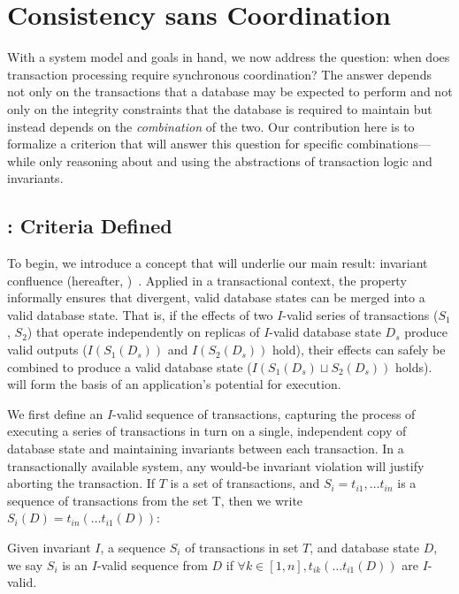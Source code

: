 
\section{Consistency sans Coordination}
\label{sec:bcc-theory}

With a system model and goals in hand, we now address the question:
when does transaction processing require synchronous coordination? The
answer depends not only on the transactions that a database may be
expected to perform and not only on the integrity constraints that the
database is required to maintain but instead depends on the
\textit{combination} of the two. Our contribution here is to formalize
a criterion that will answer this question for specific
combinations---while only reasoning about and using the abstractions
of transaction logic and invariants.

\subsection{\iconfluence: Criteria Defined}

To begin, we introduce a concept that will underlie our main result:
invariant confluence (hereafter,
\iconfluence)~\cite{obs-confluence}. Applied in a transactional
context, the \iconfluence property informally ensures that divergent,
valid database states can be merged into a valid database state. That
is, if the effects of two $I$-valid series of transactions ($S_1$,
$S_2$) that operate independently on replicas of $I$-valid database
state $D_s$ produce valid outputs ($I(S_1(D_s))$ and $I(S_2(D_s))$
hold), their effects can safely be combined to produce a valid
database state ($I(S_1(D_s) \sqcup S_2(D_s))$ holds). \iconfluence
will form the basis of an application's potential for \cfree
execution.

We first define an $I$-valid sequence of transactions, capturing the
process of executing a series of transactions in turn on a single,
independent copy of database state and maintaining invariants between
each transaction. In a transactionally available system, any would-be
invariant violation will justify aborting the transaction.  If $T$ is
a set of transactions, and $S_i = t_{i1},\dots t_{in}$ is a sequence
of transactions from the set T, then we write $S_i(D) = t_{in}(\dots
t_{i1}(D))$:

\begin{definition}
Given invariant $I$, a sequence $S_i$ of transactions in set $T$, and
database state $D$, we say $S_i$ is an $I$-valid sequence from $D$ if
$\forall k \in [1, n], t_{ik}(\dots t_{i1}(D))$ are $I$-valid.
\end{definition}

